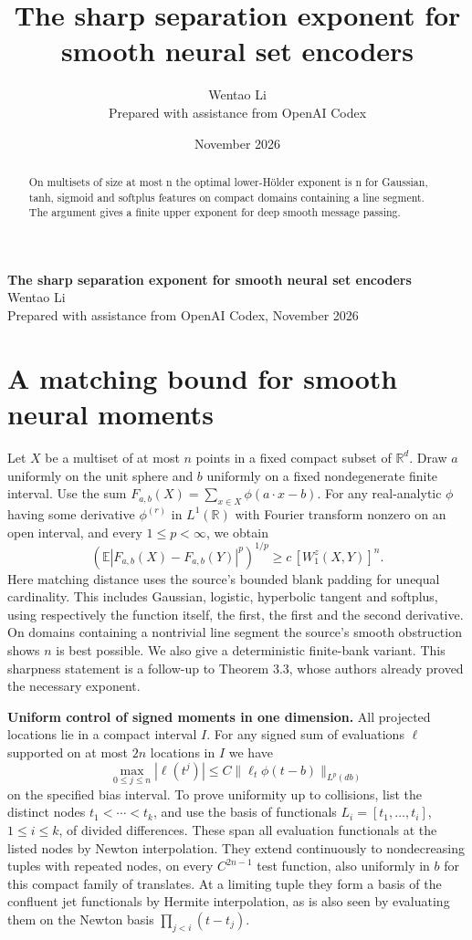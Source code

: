 \documentclass[10pt]{article}
\title{The sharp separation exponent for smooth neural set encoders}
\author{Wentao Li\\{\small Prepared with assistance from OpenAI Codex}}
\date{November 2026}
\begin{document}
\begin{center}{\Large\bfseries The sharp separation exponent for smooth neural set encoders}\\[3pt]Wentao Li\\{\small Prepared with assistance from OpenAI Codex, November 2026}\end{center}
\begin{abstract}
On multisets of size at most n the optimal lower-Hölder exponent is n for Gaussian, tanh, sigmoid and softplus features on compact domains containing a line segment. The argument gives a finite upper exponent for deep smooth message passing.
\end{abstract}
\section*{A matching bound for smooth neural moments}
Let $X$ be a multiset of at most $n$ points in a fixed compact subset of $\mathbb R^d$. Draw $a$ uniformly on the unit sphere and $b$ uniformly on a fixed nondegenerate finite interval. Use the sum $F_{a,b}(X)=\sum_{x\in X}\phi(a\cdot x-b)$. For any real-analytic $\phi$ having some derivative $\phi^{(r)}$ in $L^1(\mathbb R)$ with Fourier transform nonzero on an open interval, and every $1\le p<\infty$, we obtain
\[
 (\mathbb E |F_{a,b}(X)-F_{a,b}(Y)|^p)^{1/p}\ge c\,[W_1^z(X,Y)]^n .
\]
Here matching distance uses the source's bounded blank padding for unequal cardinality. This includes Gaussian, logistic, hyperbolic tangent and softplus, using respectively the function itself, the first, the first and the second derivative. On domains containing a nontrivial line segment the source's smooth obstruction shows $n$ is best possible. We also give a deterministic finite-bank variant. This sharpness statement is a follow-up to Theorem 3.3, whose authors already proved the necessary exponent.

\textbf{Uniform control of signed moments in one dimension.} All projected locations lie in a compact interval $I$. For any signed sum of evaluations $\ell$ supported on at most $2n$ locations in $I$ we have
\[
 \max_{0\le j\le n}|\ell(t^j)|
 \le C\|\ell_t\phi(t-b)\|_{L^p(db)}
\]
on the specified bias interval. To prove uniformity up to collisions, list the distinct nodes $t_1<\cdots<t_k$, and use the basis of functionals $L_i=[t_1,\ldots,t_i]$, $1\le i\le k$, of divided differences. These span all evaluation functionals at the listed nodes by Newton interpolation. They extend continuously to nondecreasing tuples with repeated nodes, on every $C^{2n-1}$ test function, also uniformly in $b$ for this compact family of translates. At a limiting tuple they form a basis of the confluent jet functionals by Hermite interpolation, as is also seen by evaluating them on the Newton basis $\prod_{j<i}(t-t_j)$.
\end{document}
